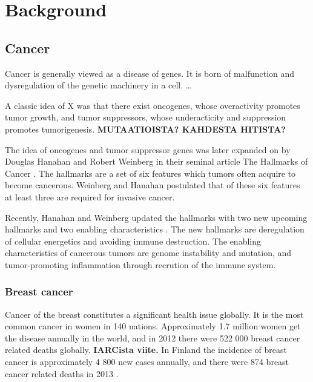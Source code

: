


\section{Background}\label{background}










\subsection{Cancer}\label{cancer}

Cancer is generally viewed as a disease of genes. It is born of malfunction
and dysregulation of the genetic machinery in a cell.
\ldots{}

A classic idea of X was that there exist oncogenes, whose overactivity
promotes tumor growth, and tumor suppressors, whose underacticity and
suppression promotes tumorigenesis. \textbf{MUTAATIOISTA? KAHDESTA HITISTA?}

The idea of oncogenes and tumor suppressor genes was later expanded on by
Douglas Hanahan and Robert Weinberg in their seminal article The Hallmarks of
Cancer \citep{Hanahan2000}. The hallmarks are a set of six features which
tumors often acquire to become cancerous. Weinberg and Hanahan postulated that
of these six features at least three are required for invasive cancer.

Recently, Hanahan and Weinberg updated the hallmarks with two new upcoming
hallmarks and two enabling characteristics \citep{Hanahan2011}. The new
hallmarks are deregulation of cellular energetics and avoiding immune
destruction. The enabling characteristics of cancerous tumors are genome
instability and mutation, and tumor-promoting inflammation through recrution
of the immune system.




\subsubsection{Breast cancer}\label{breast-cancer}

Cancer of the breast constitutes a significant health issue globally. It is
the most common cancer in women in 140 nations. Approximately 1.7 million
women get the disease annually in the world, and in 2012 there were 522 000
breast cancer related deaths globally. \textbf{IARCista viite.} In Finland the
incidence of breast cancer is approximately 4 800 new cases annually, and
there were 874 breast cancer related deaths in 2013 \citep{Syoparekisteri}.

